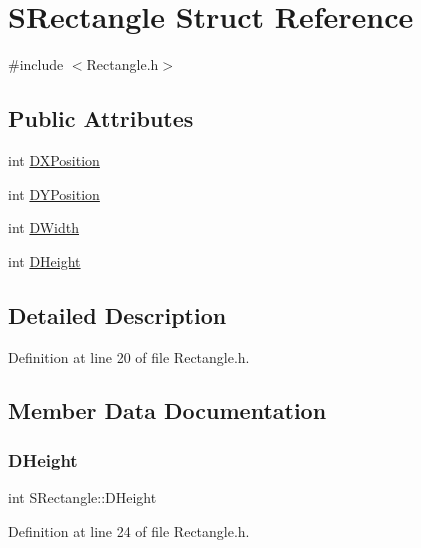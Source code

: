 \hypertarget{structSRectangle}{}\section{S\+Rectangle Struct Reference}
\label{structSRectangle}


{\ttfamily \#include $<$Rectangle.\+h$>$}

\subsection*{Public Attributes}
\begin{DoxyCompactItemize}
\item 
int \hyperlink{structSRectangle_abcbddb03b3ee416cc33109833b5f075c}{D\+X\+Position}
\item 
int \hyperlink{structSRectangle_a120aa0a90033bc6e07c36c151a3bbc71}{D\+Y\+Position}
\item 
int \hyperlink{structSRectangle_a4150898b3f7d90f6e4b0d44bf1ae3bd2}{D\+Width}
\item 
int \hyperlink{structSRectangle_a84ea3c2314c43cab6186170662188899}{D\+Height}
\end{DoxyCompactItemize}


\subsection{Detailed Description}


Definition at line 20 of file Rectangle.\+h.



\subsection{Member Data Documentation}
\hypertarget{structSRectangle_a84ea3c2314c43cab6186170662188899}{}\label{structSRectangle_a84ea3c2314c43cab6186170662188899} 
\subsubsection{\texorpdfstring{D\+Height}{DHeight}}
{\footnotesize\ttfamily int S\+Rectangle\+::\+D\+Height}



Definition at line 24 of file Rectangle.\+h.

\hypertarget{structSRectangle_a4150898b3f7d90f6e4b0d44bf1ae3bd2}{}\label{structSRectangle_a4150898b3f7d90f6e4b0d44bf1ae3bd2} 
